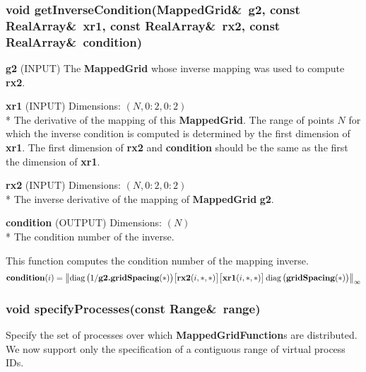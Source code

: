 \documentclass{article}
\begin{document}
  \subsubsection{void getInverseCondition(MappedGrid\&~g2, const RealArray\&~xr1, const RealArray\&~rx2, const RealArray\&~condition)}
  \label{MappedGrid::getInverseCondition(g2,xr1,rx2,condition)}
    \begin{description}
      \item{\textbf{g2}  (INPUT)} The \textbf{MappedGrid} whose inverse mapping was used to compute \textbf{rx2}.
      \item{\textbf{xr1} (INPUT)} Dimensions:  $(N,0\colon2,0\colon2)$\\*
                            The derivative of the mapping of this \textbf{MappedGrid}.
                            The range of points $N$
                            for which the inverse condition is computed is determined by the
                            first dimension of \textbf{xr1}.  The first dimension of
                            \textbf{rx2} and \textbf{condition} should be the same as the first
                            the dimension of \textbf{xr1}.
      \item{\textbf{rx2} (INPUT)} Dimensions:  $(N,0\colon2,0\colon2)$\\*
                            The inverse derivative of the mapping of \textbf{MappedGrid} \textbf{g2}.
      \item{\textbf{condition} (OUTPUT)} Dimensions:  $(N)$\\*
                            The condition number of the inverse.
    \end{description}
    This function computes the condition number of the mapping inverse.
    \def\diag{\mathop{\rm diag}\nolimits}
    \[
      \textbf{condition}(i) = \left\| \diag \big( 1/\textbf{g2.gridSpacing}(\ast) \big)
                                              \big[ \textbf{rx2}(i,\ast,\ast) \big]
                                              \big[ \textbf{xr1}(i,\ast,\ast) \big]
                                        \diag \big( \textbf{gridSpacing}(\ast) \big) \right\|_\infty
    \]
  \subsubsection{void specifyProcesses(const Range\&~range)}
  \label{MappedGrid::specifyProcesses(range)}
    Specify the set of processes over which \textbf{MappedGridFunction}s are distributed.
    We now support only the specification of a contiguous range of virtual process IDs.
\end{document}
